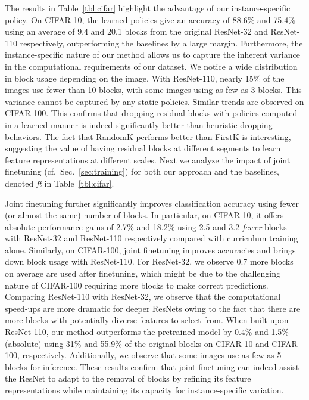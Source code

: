 \documentclass[10pt,twocolumn,letterpaper]{article}
\begin{document}
The results in Table~\ref{tbl:cifar} highlight the advantage of our instance-specific policy. On CIFAR-10, the learned policies give an accuracy of 88.6\% and 75.4\% using an average of 9.4 and 20.1 blocks from the original ResNet-32 and ResNet-110 respectively, outperforming the baselines by a large margin. Furthermore, the instance-specific nature of our method allows us to capture the inherent variance in the computational requirements of our dataset. We notice a wide distribution in block usage depending on the image. With ResNet-110, nearly 15\% of the images use fewer than 10 blocks, with some images using as few as 3 blocks. This variance cannot be captured by any static policies. Similar trends are observed on CIFAR-100. This confirms that dropping residual blocks with policies computed in a learned manner is indeed significantly better than heuristic dropping behaviors. 
The fact that RandomK performs better than FirstK is interesting, suggesting the value of having residual blocks at different segments to learn feature representations at different scales. %
Next we analyze the impact of joint finetuning (cf.~Sec.~\ref{sec:training}) for both our approach and the baselines, denoted \emph{ft} in Table~\ref{tbl:cifar}.

Joint finetuning further significantly improves classification accuracy using fewer (or almost the same) number of blocks. In particular, on CIFAR-10, it offers absolute performance gains of 2.7\% and 18.2\% using 2.5 and 3.2 {\em fewer} blocks with ResNet-32 and ResNet-110 respectively compared with curriculum training alone. Similarly, on CIFAR-100, joint finetuning improves accuracies and brings down block usage with ResNet-110. For ResNet-32, we observe 0.7 more blocks on average are used after finetuning, which might be due to the challenging nature of CIFAR-100 requiring more blocks to make correct predictions. Comparing ResNet-110 with ResNet-32, we observe that the computational speed-ups are more dramatic for deeper ResNets owing to the fact that there are more blocks with potentially diverse features to select from. 
When built upon ResNet-110, our method outperforms the pretrained model by 0.4\% and 1.5\% (absolute) using 31\% and 55.9\% of the original blocks on CIFAR-10 and CIFAR-100, respectively. Additionally, we observe that some images use as few as 5 blocks for inference. These results confirm that joint finetuning can indeed assist the ResNet to adapt to the removal of blocks by refining its feature representations while maintaining its capacity for instance-specific variation.
\end{document}
